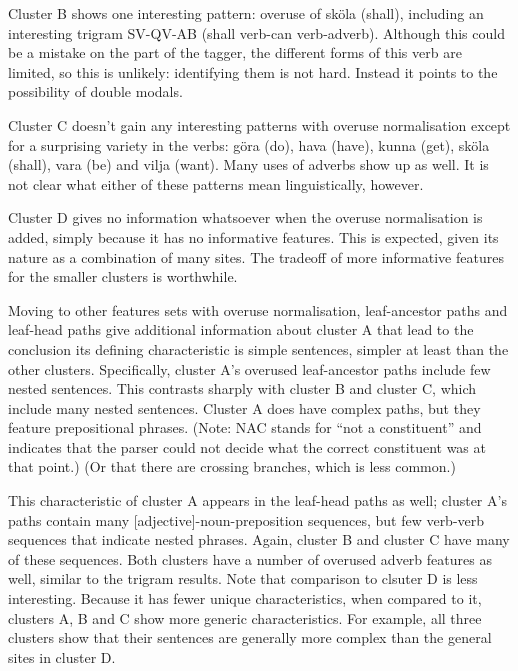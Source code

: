 Cluster B shows one interesting pattern: overuse of sk\"ola (shall),
including an interesting trigram SV-QV-AB (shall verb-can
verb-adverb). Although this could be a mistake on the part of the
tagger, the different forms of this verb are limited, so this is
unlikely: identifying them is not hard. Instead it points to the
possibility of double modals.

Cluster C doesn't gain any interesting patterns with overuse
normalisation except for a surprising variety in the verbs: g\"ora
(do), hava (have), kunna (get), sk\"ola (shall), vara (be) and vilja
(want). Many uses of adverbs show up as well. It is not clear what
either of these patterns mean linguistically, however.

Cluster D gives no information whatsoever when the overuse
normalisation is added, simply because it has no informative
features. This is expected, given its nature as a combination of many
sites. The tradeoff of more informative features for the smaller
clusters is worthwhile.

Moving to other features sets with overuse normalisation,
leaf-ancestor paths and leaf-head paths give additional information
about cluster A that lead to the conclusion its defining
characteristic is simple sentences, simpler at least than the other
clusters. Specifically, cluster A's overused leaf-ancestor paths
include few nested sentences. This contrasts sharply with cluster B
and cluster C, which include many nested sentences. Cluster A does
have complex paths, but they feature prepositional phrases. (Note: NAC
stands for ``not a constituent'' and indicates that the parser could
not decide what the correct constituent was at that point.) (Or that
there are crossing branches, which is less common.)

This characteristic of cluster A appears in the leaf-head paths as
well; cluster A's paths contain many [adjective]-noun-preposition
sequences, but few verb-verb sequences that indicate nested
phrases. Again, cluster B and cluster C have many of these
sequences. Both clusters have a number of overused adverb features as
well, similar to the trigram results. Note that comparison to clsuter
D is less interesting. Because it has fewer unique characteristics,
when compared to it, clusters A, B and C show more generic
characteristics. For example, all three clusters show that their
sentences are generally more complex than the general sites in cluster D.

